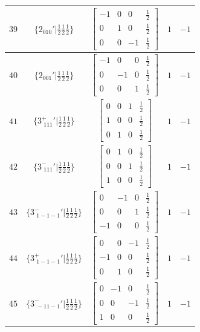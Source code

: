 \documentclass[fleqn,8pt]{jsarticle}
\begin{document}
\begin{longtable}{ccccc}
$ 39 $ & $ \{2{}_{010}{}'|\frac{1}{2} \frac{1}{2} \frac{1}{2}\} $ & $ \begin{bmatrix} -1 & 0 & 0 & \frac{1}{2} \\ 0 & 1 & 0 & \frac{1}{2} \\ 0 & 0 & -1 & \frac{1}{2} \end{bmatrix} $ & $ 1 $ & $ -1 $ \\ \hline
$ 40 $ & $ \{2{}_{001}{}'|\frac{1}{2} \frac{1}{2} \frac{1}{2}\} $ & $ \begin{bmatrix} -1 & 0 & 0 & \frac{1}{2} \\ 0 & -1 & 0 & \frac{1}{2} \\ 0 & 0 & 1 & \frac{1}{2} \end{bmatrix} $ & $ 1 $ & $ -1 $ \\ \hline
$ 41 $ & $ \{3^{+}_{\,\,111}{}'|\frac{1}{2} \frac{1}{2} \frac{1}{2}\} $ & $ \begin{bmatrix} 0 & 0 & 1 & \frac{1}{2} \\ 1 & 0 & 0 & \frac{1}{2} \\ 0 & 1 & 0 & \frac{1}{2} \end{bmatrix} $ & $ 1 $ & $ -1 $ \\ \hline
$ 42 $ & $ \{3^{-}_{\,\,111}{}'|\frac{1}{2} \frac{1}{2} \frac{1}{2}\} $ & $ \begin{bmatrix} 0 & 1 & 0 & \frac{1}{2} \\ 0 & 0 & 1 & \frac{1}{2} \\ 1 & 0 & 0 & \frac{1}{2} \end{bmatrix} $ & $ 1 $ & $ -1 $ \\ \hline
$ 43 $ & $ \{3^{-}_{\,\,1-1-1}{}'|\frac{1}{2} \frac{1}{2} \frac{1}{2}\} $ & $ \begin{bmatrix} 0 & -1 & 0 & \frac{1}{2} \\ 0 & 0 & 1 & \frac{1}{2} \\ -1 & 0 & 0 & \frac{1}{2} \end{bmatrix} $ & $ 1 $ & $ -1 $ \\ \hline
$ 44 $ & $ \{3^{+}_{\,\,1-1-1}{}'|\frac{1}{2} \frac{1}{2} \frac{1}{2}\} $ & $ \begin{bmatrix} 0 & 0 & -1 & \frac{1}{2} \\ -1 & 0 & 0 & \frac{1}{2} \\ 0 & 1 & 0 & \frac{1}{2} \end{bmatrix} $ & $ 1 $ & $ -1 $ \\ \hline
$ 45 $ & $ \{3^{-}_{\,\,-11-1}{}'|\frac{1}{2} \frac{1}{2} \frac{1}{2}\} $ & $ \begin{bmatrix} 0 & -1 & 0 & \frac{1}{2} \\ 0 & 0 & -1 & \frac{1}{2} \\ 1 & 0 & 0 & \frac{1}{2} \end{bmatrix} $ & $ 1 $ & $ -1 $ \\ \hline

\end{longtable}
\end{document}
